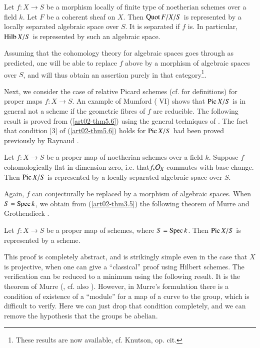 \begin{theorem}\label{art02-thm6.1}
Let $f:X\to S$ be a morphism locally of finite type of noetherian schemes over a field $k$. Let $F$ be a coherent sheaf on $X$. Then $\operatorname{\mathrm{Quot}} F/X/S$ is represented by a locally separated algebraic space over $S$. It is separated if $f$ is. In particular, $\operatorname{\mathrm{Hilb}} X/S$ is represented by such an algebraic space.
\end{theorem}

\noindent
Assuming that the cohomology theory for algebraic spaces goes through as predicted, one will be able to replace $f$ above by a morphism of algebraic spaces over $S$, and will thus obtain an assertion purely in that category\footnote{These results are now available, cf. Knutson, op. cit.}. 

Next, we consider the case of relative Picard schemes (cf. \cite{art02-key13} for definitions) for proper maps $f:X\to S$. An example of Mumford (\cite{art02-key13} VI) shows that $\operatorname{\mathrm{Pic}} X/S$ is in general not a scheme if the geometric fibres of $f$ are reducible. The following result is proved from (\ref{art02-thm5.6}) using the general techniques of \cite{art02-key13}. The fact that condition [3] of (\ref{art02-thm5.6}) holds for $\operatorname{\mathrm{Pic}} X/S$ had been proved previously by Raynaud \cite{art02-key30}.

\begin{theorem}\label{art02-thm6.2}
Let $f:X\to S$ be a proper map of noetherian schemes over a field $k$. Suppose $f$ cohomologically flat in dimension zero, i.e. that\pageoriginale $f_{*}\mathcal{O}_{X}$ commutes with base change. Then $\operatorname{\mathrm{Pic}} X/S$ is represented by a locally separated algebraic space over $S$.
\end{theorem}

\noindent
Again, $f$ can conjecturally be replaced by a morphism of algebraic spaces. When $S=\operatorname{\mathrm{Spec}} k$, we obtain from (\ref{art02-thm3.5}) the following theorem of Murre and Grothendieck \cite{art02-key27}.

\begin{theorem}\label{art02-thm6.3}
Let $f:X\to S$ be a proper map of schemes, where $S=\operatorname{\mathrm{Spec}} k$. Then $\operatorname{\mathrm{Pic}} X/S$ is represented by a scheme.
\end{theorem}

This proof is completely abstract, and is strikingly simple even in the case that $X$ is projective, when one can give a ``classical'' proof using Hilbert schemes. The verification can be reduced to a minimum using the following result. It is the theorem of Murre (\cite{art02-key27}, cf. also \cite{art02-key23}). However, in Murre's formulation there is a condition of existence of a ``module'' for a map of a curve to the group, which is difficult to verify. Here we can just drop that condition completely, and we can remove the hypothesis that the groups be abelian.

